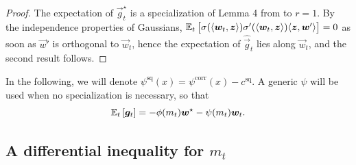 \begin{proof}
    The expectation of $\vec{g}_t^\star$ is a specialization of Lemma 4 from \cite{dandi2023how} to $r = 1$. By the independence properties of Gaussians, $\mathbb{E}_t\left[\sigma(\langle {\boldsymbol{w}}_t, {\boldsymbol{z}} \rangle) \sigma'(\langle {\boldsymbol{w}}_t, {\boldsymbol{z}} \rangle) \langle{\boldsymbol{z}}, {\boldsymbol{w}}'\rangle\right] = 0$ as soon as $\vec{w}'$ is orthogonal to $\vec{w}_t$, hence the expectation of $\hat{\vec{g}}_t$ lies along $\vec{w}_t$, and the second result follows.
\end{proof}

In the following, we will denote $\psi^{\mathrm{sq}}(x) = \psi^{\mathrm{corr}}(x) - c^{\mathrm{sq}}$. A generic $\psi$ will be used when no specialization is necessary, so that
\begin{equation}\label{2406:eq:app:exp_g}
    \mathbb{E}_t\left[{\boldsymbol{g}}_t\right] = -\phi(m_t) {\boldsymbol{w}}^\star - \psi(m_t) {\boldsymbol{w}}_t.
\end{equation}

\subsection{A differential inequality for \texorpdfstring{$m_t$}{m\_t}}

